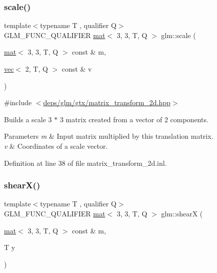 \subsubsection{\texorpdfstring{scale()}{scale()}}
{\footnotesize\ttfamily template$<$typename T , qualifier Q$>$ \\
G\+L\+M\+\_\+\+F\+U\+N\+C\+\_\+\+Q\+U\+A\+L\+I\+F\+I\+ER \hyperlink{structglm_1_1mat}{mat}$<$ 3, 3, T, Q $>$ glm\+::scale (\begin{DoxyParamCaption}\item[{\hyperlink{structglm_1_1mat}{mat}$<$ 3, 3, T, Q $>$ const \&}]{m,  }\item[{\hyperlink{structglm_1_1vec}{vec}$<$ 2, T, Q $>$ const \&}]{v }\end{DoxyParamCaption})}



{\ttfamily \#include $<$\hyperlink{matrix__transform__2d_8hpp}{deps/glm/gtx/matrix\+\_\+transform\+\_\+2d.\+hpp}$>$}

Builds a scale 3 $\ast$ 3 matrix created from a vector of 2 components.


\begin{DoxyParams}{Parameters}
{\em m} & Input matrix multiplied by this translation matrix. \\
\hline
{\em v} & Coordinates of a scale vector. \\
\hline
\end{DoxyParams}


Definition at line 38 of file matrix\+\_\+transform\+\_\+2d.\+inl.

\mbox{\label{group__gtx__matrix__transform__2d_gab0c6659f6895e2536aed6c893d70aa74}} 
\subsubsection{\texorpdfstring{shear\+X()}{shearX()}}
{\footnotesize\ttfamily template$<$typename T , qualifier Q$>$ \\
G\+L\+M\+\_\+\+F\+U\+N\+C\+\_\+\+Q\+U\+A\+L\+I\+F\+I\+ER \hyperlink{structglm_1_1mat}{mat}$<$ 3, 3, T, Q $>$ glm\+::shearX (\begin{DoxyParamCaption}\item[{\hyperlink{structglm_1_1mat}{mat}$<$ 3, 3, T, Q $>$ const \&}]{m,  }\item[{T}]{y }\end{DoxyParamCaption})}



